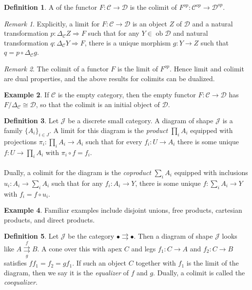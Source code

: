 \documentclass[10pt,letterpaper,cm]{nupset}
\theoremstyle{definition}
\newtheorem{definition}{Definition}
\newtheorem{exmp}[definition]{Example}
\theoremstyle{theorem}
\theoremstyle{remark}
\newtheorem{remark}{Remark}
\newcommand{\1}{\mathbf{1}}
\renewcommand{\c}{\mathscr{C}}
\renewcommand{\d}{\mathscr{D}}
\renewcommand{\j}{\mathscr{J}}
\newcommand{\0}{\vec 0}
\DeclareMathOperator{\ob}{ob}
\begin{document}
\begin{definition}
A  of the functor $F: \c \to \d$ is the colimit of $F^{op} : \c^{op} \to \d^{op}$.
\end{definition}

\begin{remark}
Explicitly,  a limit for $F: \c \to \d$ is an object $Z$ of $\d$ and a natural transformation $p: \Delta_{\c}Z \Rightarrow F$ such that for any $Y \in \ob \d$ and natural transformation $q: \Delta_{\c}Y \Rightarrow F$, there is a unique morphism $g: Y \to Z$ such that $ q= p \circ \Delta_{\c}g$.
\end{remark}

\begin{remark}
The colimit of a functor $F$ is the limit of $F^{op}$. Hence limit and colimit are dual properties, and the above results for colimits can be dualized.
\end{remark}

\begin{exmp}
If $\c$ is the empty category, then the empty functor $F: \c \to \d$ has $F/\Delta_{\c}\cong \d$, so that the colimit is an initial object of $\d$.
\end{exmp}

\begin{definition}
Let $\j$ be a discrete small category. A diagram of shape $\j$ is a family $\{A_i\}_{i\in J}$. A limit for this diagram is the \textit{product} $\prod_i A_i$ equipped with projections $\pi_i : \prod_i A_i \to A_i$ such that for every $f_{i} : U \to A_i$ there is some unique $f: U \to \prod_i A_i$ with $\pi_i \circ f = f_i$. 
\\ \\ Dually, a colimit for the diagram is the \textit{coproduct} $\sum_i A_i$ equipped with inclusions $u_i : A_i \to \sum_i A_i$ such that for any $f_i : A_i \to Y$, there is some unique $f : \sum_i A_i \to Y$ with $f_i = f \circ u_i$.
\end{definition}

\begin{exmp}
Familiar examples include disjoint unions, free products, cartesian products, and direct products. 
\end{exmp}

\begin{definition}
Let $\j$ be the category $\bullet \rightrightarrows \bullet$. Then  a diagram of shape $\j$ looks like $A \overset{f}{\underset{g}{\rightrightarrows}} B$. A cone over this with apex $C$ and legs $f_1 : C \to A$ and $f_2 : C \to B$ satisfies $ff_1=f_2 = gf_1$. If such an object $C$ together with $f_1$ is the limit of the diagram, then we say it is the \textit{equalizer} of $f$ and $g$. Dually, a colimit is called the \textit{coequalizer}.
\end{definition}
\end{document}
